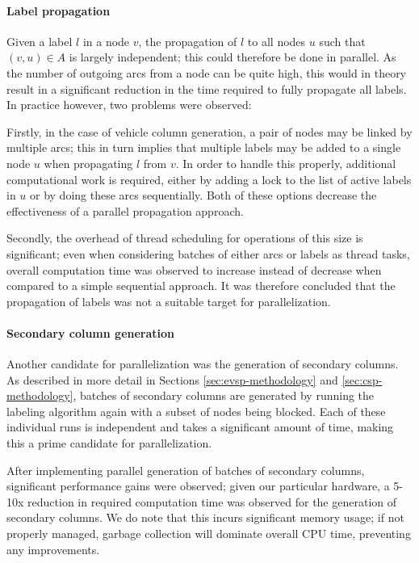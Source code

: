 \documentclass[]{article}
\begin{document}
\paragraph{Label propagation}
Given a label $l$ in a node $v$, the propagation of $l$ to all nodes $u$ such that $(v, u) \in A$ is largely independent; this could therefore be done in parallel. As the number of outgoing arcs from a node can be quite high, this would in theory result in a significant reduction in the time required to fully propagate all labels. In practice however, two problems were observed: 

Firstly, in the case of vehicle column generation, a pair of nodes may be linked by multiple arcs; this in turn implies that multiple labels may be added to a single node $u$ when propagating $l$ from $v$. In order to handle this properly, additional computational work is required, either by adding a lock to the list of active labels in $u$ or by doing these arcs sequentially. Both of these options decrease the effectiveness of a parallel propagation approach. 

Secondly, the overhead of thread scheduling for operations of this size is significant; even when considering batches of either arcs or labels as thread tasks, overall computation time was observed to increase instead of decrease when compared to a simple sequential approach. It was therefore concluded that the propagation of labels was not a suitable target for parallelization.

\paragraph{Secondary column generation}
Another candidate for parallelization was the generation of secondary columns. As described in more detail in Sections \ref{sec:evsp-methodology} and \ref{sec:csp-methodology}, batches of secondary columns are generated by running the labeling algorithm again with a subset of nodes being blocked. Each of these individual runs is independent and takes a significant amount of time, making this a prime candidate for parallelization.

After implementing parallel generation of batches of secondary columns, significant performance gains were observed; given our particular hardware, a 5-10x reduction in required computation time was observed for the generation of secondary columns. We do note that this incurs significant memory usage; if not properly managed, garbage collection will dominate overall CPU time, preventing any improvements.  
\end{document}
